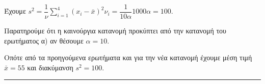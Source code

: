 \begin{alist}
\begin{rlist}
    \item Έχουμε $s^2 = \dfrac{1}{\nu}\sum_{i=1}^{4}(x_i - \bar{x})^2 \nu_i = \dfrac{1}{10\alpha}1000\alpha = 100$.

    \item
    Παρατηρούμε ότι η καινούργια κατανομή προκύπτει από την κατανομή του ερωτήματος α) αν θέσουμε $\alpha=10$.
    \par
    Οπότε από τα προηγούμενα ερωτήματα και για την νέα κατανομή έχουμε μέση τιμή $\bar{x}=55$ και διακύμανση $s^2=100$.
\end{rlist}
\end{alist}
\vspace{6mm}
\noindent\rule{\textwidth}{0.4pt}
\vspace{6mm}

